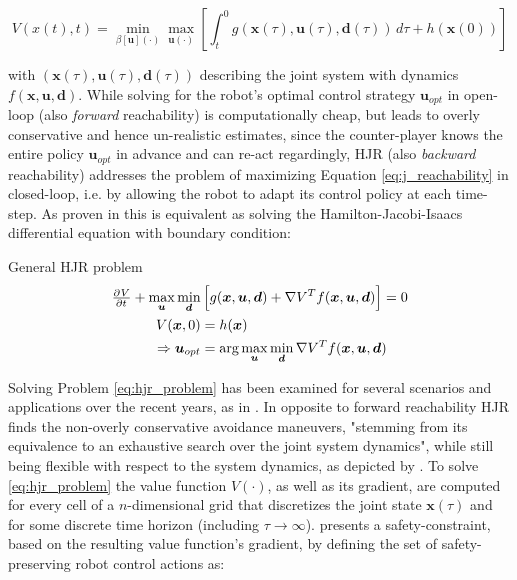 \begin{equation}
V(x(t), t) = \min_{\beta[\boldsymbol{u}](\cdot)} \max_{\boldsymbol{u}(\cdot)} \left[ \int_t^0 g(\boldsymbol{x}(\tau), \boldsymbol{u}(\tau), \boldsymbol{d}(\tau)) \, d\tau + h(\boldsymbol{x}(0)) \right]
\label{eq:j_reachability}
\end{equation}

with $(\boldsymbol{x}(\tau), \boldsymbol{u}(\tau), \boldsymbol{d}(\tau))$ describing the joint system with dynamics $f(\boldsymbol{x}, \boldsymbol{u}, \boldsymbol{d})$. While solving for the robot's optimal control strategy $\boldsymbol{u}_{opt}$ in open-loop (also \textit{forward} reachability) is computationally cheap, but leads to overly conservative and hence un-realistic estimates, since the counter-player knows the entire policy $\boldsymbol{u}_{opt}$ in advance and can re-act regardingly, \ac{HJR} (also \textit{backward} reachability) addresses the problem of maximizing Equation \ref{eq:j_reachability} in closed-loop, i.e. by allowing the robot to adapt its control policy at each time-step. As proven in \cite{Pavone2020} this is equivalent as solving the Hamilton-Jacobi-Isaacs differential equation with boundary condition: \\

\begin{problem}{General \ac{HJR} problem}
\begin{align}
\pd{V}{t} + \max_{\boldsymbol{u}}  \min_{\boldsymbol{d}} &\left[g(\boldsymbol{x}, \boldsymbol{u}, \boldsymbol{d}) + \nabla V^T f(\boldsymbol{x}, \boldsymbol{u}, \boldsymbol{d}) \right] = 0 \\ 
V(\boldsymbol{x}, 0) &= h(\boldsymbol{x}) \\
\Rightarrow \boldsymbol{u}_{opt} &= \arg \max_{\boldsymbol{u}}  \min_{\boldsymbol{d}} \nabla V^T f(\boldsymbol{x}, \boldsymbol{u}, \boldsymbol{d})
\label{eq:hjr_problem_u}
\end{align}
\label{eq:hjr_problem}
\end{problem}

Solving Problem \ref{eq:hjr_problem} has been examined for several scenarios and applications over the recent years, as in \cite{Dhinakaran2017}\cite{Margellos2009}\cite{Chen2017b}. In opposite to forward reachability \ac{HJR} finds the non-overly conservative avoidance maneuvers, "stemming from its equivalence to an exhaustive search over the joint system dynamics", while still being flexible with respect to the system dynamics, as depicted by \cite{Leung2020}. To solve \ref{eq:hjr_problem} the value function $V(\cdot)$, as well as its gradient, are computed for every cell of a $n$-dimensional grid that discretizes the joint state $\boldsymbol{x}(\tau)$ and for some discrete time horizon (including $\tau \rightarrow \infty$). 
\newline
\cite{Leung2020} presents a safety-constraint, based on the resulting value function's gradient, by defining the set of safety-preserving robot control actions as:

